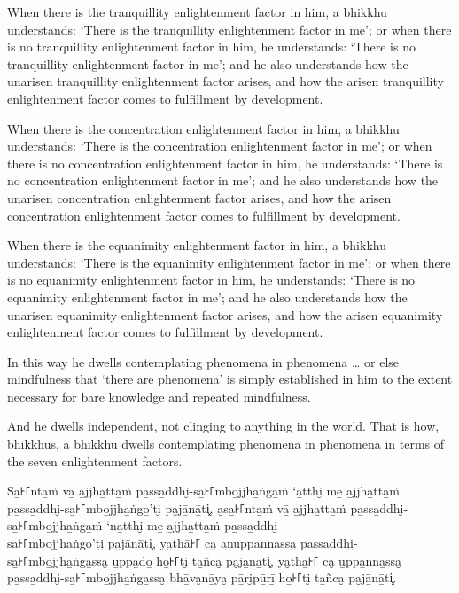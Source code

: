 \englishPage

When there is the tranquillity enlightenment factor in him, a bhikkhu
understands: `There is the tranquillity enlightenment factor in me'; or when
there is no tranquillity enlightenment factor in him, he understands: `There is
no tranquillity enlightenment factor in me'; and he also understands how the
unarisen tranquillity enlightenment factor arises, and how the arisen
tranquillity enlightenment factor comes to fulfillment by development.

When there is the concentration enlightenment factor in him, a bhikkhu
understands: `There is the concentration enlightenment factor in me'; or when
there is no concentration enlightenment factor in him, he understands: `There is
no concentration enlightenment factor in me'; and he also understands how the
unarisen concentration enlightenment factor arises, and how the arisen
concentration enlightenment factor comes to fulfillment by development.

When there is the equanimity enlightenment factor in him, a bhikkhu understands:
`There is the equanimity enlightenment factor in me'; or when there is no
equanimity enlightenment factor in him, he understands: `There is no equanimity
enlightenment factor in me'; and he also understands how the unarisen equanimity
enlightenment factor arises, and how the arisen equanimity enlightenment factor
comes to fulfillment by development.

\enlargethispage{2\baselineskip}

In this way he dwells contemplating phenomena in phenomena \ldots{} or else
mindfulness that ‘there are phenomena’ is simply established in him to the
extent necessary for bare knowledge and repeated mindfulness.

And he dwells independent, not clinging to anything in the world. That is how,
bhikkhus, a bhikkhu dwells contemplating phenomena in phenomena in terms of the
seven enlightenment factors.


\paliPage

Sa̱꜔꜒nta̱ṁ vā̱ a̱jjha̱tta̱ṁ pa̱ssa̱ddhi̮-sa̱꜔꜒mbo̱jjha̱ṅga̱ṁ ‘a̱tthi̮ me̱ a̱jjha̱tta̱ṁ pa̱ssa̱ddhi̮-sa̱꜔꜒mbo̱jjha̱ṅgo̱’ti̮ pa̮jā̱nā̱ti͓,
a̮sa̱꜔꜒nta̱ṁ vā̱ a̱jjha̱tta̱ṁ pa̱ssa̱ddhi̮-sa̱꜔꜒mbo̱jjha̱ṅga̱ṁ ‘na̱tthi̮ me̱ a̱jjha̱tta̱ṁ pa̱ssa̱ddhi̮-\\ sa̱꜔꜒mbo̱jjha̱ṅgo̱’ti̮ pa̮jā̱nā̱ti͓,
ya̮thā̱꜔꜒ ca̮ a̮nu̱ppa̱nna̱ssa̮ pa̱ssa̱ddhi̮-\\ sa̱꜔꜒mbo̱jjha̱ṅga̱ssa̮ u̱ppā̱do̱ ho̱꜔꜒ti̮ ta̱ñca̮ pa̮jā̱nā̱ti͓,
ya̮thā̱꜔꜒ ca̮ u̱ppa̱nna̱ssa̮ pa̱ssa̱ddhi̮-sa̱꜔꜒mbo̱jjha̱ṅga̱ssa̮ bhā̱va̮nā̱ya̮ pā̱ri̮pū̱rī̱ ho̱꜔꜒ti̮ ta̱ñca̮ pa̮jā̱nā̱ti͓.

